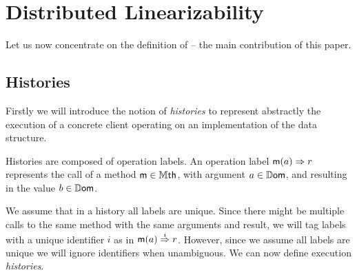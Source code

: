 
\section{Distributed Linearizability}
\label{sec:distributed-lin}

Let us now concentrate on the definition of \crdtlin{} -- the main
contribution of this paper.
%

\subsection{Histories}
\label{subsec:histories}

Firstly we will introduce the notion of \emph{histories} to represent
abstractly the execution of a concrete client operating on an
implementation of the data structure.

Histories are composed of operation labels.
An operation label $\mathsf{m}(a) \Rightarrow r$ represents the call of a method
$\mathsf{m} \in \mathbb{M}\mathsf{th}$, with argument $a \in \mathbb{D}\mathsf{om}$, and
resulting in the value $b \in \mathbb{D}\mathsf{om}$.

We assume that in a history all labels are unique.
Since there might be multiple calls to the same method with the same
arguments and result, we will tag labels with a unique identifier $i$
as in $\mathsf{m}(a) \overset{i}{\Rightarrow} r$.
However, since we assume all labels are unique we will ignore
identifiers when unambiguous.
We can now define execution \emph{histories}.





